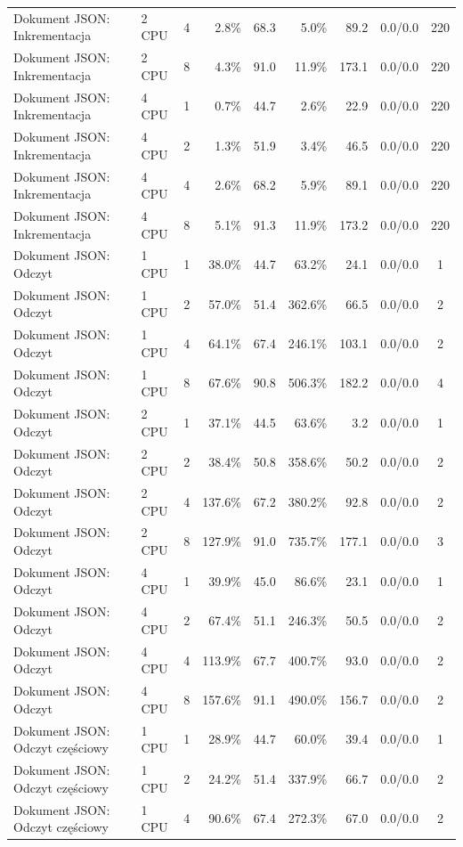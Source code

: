 \begin{table}[ht]
{\begin{tabular}{llcrrrrcc}
Dokument JSON: Inkrementacja & 2 CPU & 4 & 2.8\% & 68.3 & 5.0\% & 89.2 & 0.0/0.0 & 220 \\
Dokument JSON: Inkrementacja & 2 CPU & 8 & 4.3\% & 91.0 & 11.9\% & 173.1 & 0.0/0.0 & 220 \\
Dokument JSON: Inkrementacja & 4 CPU & 1 & 0.7\% & 44.7 & 2.6\% & 22.9 & 0.0/0.0 & 220 \\
Dokument JSON: Inkrementacja & 4 CPU & 2 & 1.3\% & 51.9 & 3.4\% & 46.5 & 0.0/0.0 & 220 \\
Dokument JSON: Inkrementacja & 4 CPU & 4 & 2.6\% & 68.2 & 5.9\% & 89.1 & 0.0/0.0 & 220 \\
Dokument JSON: Inkrementacja & 4 CPU & 8 & 5.1\% & 91.3 & 11.9\% & 173.2 & 0.0/0.0 & 220 \\
Dokument JSON: Odczyt & 1 CPU & 1 & 38.0\% & 44.7 & 63.2\% & 24.1 & 0.0/0.0 & 1 \\
Dokument JSON: Odczyt & 1 CPU & 2 & 57.0\% & 51.4 & 362.6\% & 66.5 & 0.0/0.0 & 2 \\
Dokument JSON: Odczyt & 1 CPU & 4 & 64.1\% & 67.4 & 246.1\% & 103.1 & 0.0/0.0 & 2 \\
Dokument JSON: Odczyt & 1 CPU & 8 & 67.6\% & 90.8 & 506.3\% & 182.2 & 0.0/0.0 & 4 \\
Dokument JSON: Odczyt & 2 CPU & 1 & 37.1\% & 44.5 & 63.6\% & 3.2 & 0.0/0.0 & 1 \\
Dokument JSON: Odczyt & 2 CPU & 2 & 38.4\% & 50.8 & 358.6\% & 50.2 & 0.0/0.0 & 2 \\
Dokument JSON: Odczyt & 2 CPU & 4 & 137.6\% & 67.2 & 380.2\% & 92.8 & 0.0/0.0 & 2 \\
Dokument JSON: Odczyt & 2 CPU & 8 & 127.9\% & 91.0 & 735.7\% & 177.1 & 0.0/0.0 & 3 \\
Dokument JSON: Odczyt & 4 CPU & 1 & 39.9\% & 45.0 & 86.6\% & 23.1 & 0.0/0.0 & 1 \\
Dokument JSON: Odczyt & 4 CPU & 2 & 67.4\% & 51.1 & 246.3\% & 50.5 & 0.0/0.0 & 2 \\
Dokument JSON: Odczyt & 4 CPU & 4 & 113.9\% & 67.7 & 400.7\% & 93.0 & 0.0/0.0 & 2 \\
Dokument JSON: Odczyt & 4 CPU & 8 & 157.6\% & 91.1 & 490.0\% & 156.7 & 0.0/0.0 & 2 \\
Dokument JSON: Odczyt częściowy & 1 CPU & 1 & 28.9\% & 44.7 & 60.0\% & 39.4 & 0.0/0.0 & 1 \\
Dokument JSON: Odczyt częściowy & 1 CPU & 2 & 24.2\% & 51.4 & 337.9\% & 66.7 & 0.0/0.0 & 2 \\
Dokument JSON: Odczyt częściowy & 1 CPU & 4 & 90.6\% & 67.4 & 272.3\% & 67.0 & 0.0/0.0 & 2 \\

\end{tabular}}
\end{table}
